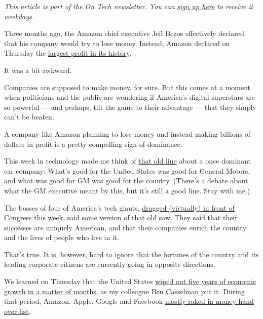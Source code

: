 \emph{This article is part of the On Tech newsletter. You can}
\href{https://www.nytimes3xbfgragh.onion/newsletters/signup/OT}{\emph{sign
up here}} \emph{to receive it weekdays.}

Three months ago, the Amazon chief executive Jeff Bezos effectively
declared that his company would try to lose money. Instead, Amazon
declared on Thursday the
\href{https://www.nytimes3xbfgragh.onion/live/2020/07/30/business/stock-market-today-coronavirus/amazons-earnings-double-as-sales-surge}{largest
profit in its history}.

It was a bit awkward.

Companies are supposed to make money, for sure. But this comes at a
moment when politicians and the public are wondering if America's
digital superstars are so powerful --- and perhaps, tilt the game to
their advantage --- that they simply can't be beaten.

A company like Amazon planning to lose money and instead making billions
of dollars in profit is a pretty compelling sign of dominance.

This week in technology made me think of
\href{https://www.nytimes3xbfgragh.onion/1992/11/06/business/is-gm-fate-still-crucial-to-us.html}{that
old line} about a once dominant car company: What's good for the United
States was good for General Motors, and what was good for GM was good
for the country. (There's a debate about what the GM executive meant by
this, but it's still a good line. Stay with me.)

The bosses of four of America's tech giants,
\href{https://www.nytimes3xbfgragh.onion/2020/07/29/technology/big-tech-hearing-apple-amazon-facebook-google.html}{dragged
(virtually) in front of Congress this week}, said some version of that
old saw. They said that their successes are uniquely American, and that
their companies enrich the country and the lives of people who live in
it.

That's true. It is, however, hard to ignore that the fortunes of the
country and its leading corporate citizens are currently going in
opposite directions.

We learned on Thursday that the United States
\href{https://www.nytimes3xbfgragh.onion/2020/07/30/business/economy/q2-gdp-coronavirus-economy.html}{wiped
out five years of economic growth in a matter of months}, as my
colleague Ben Casselman put it. During that period, Amazon, Apple,
Google and Facebook
\href{https://www.nytimes3xbfgragh.onion/2020/07/30/technology/tech-company-earnings-amazon-apple-facebook-google.html}{mostly
raked in money hand over fist}.

